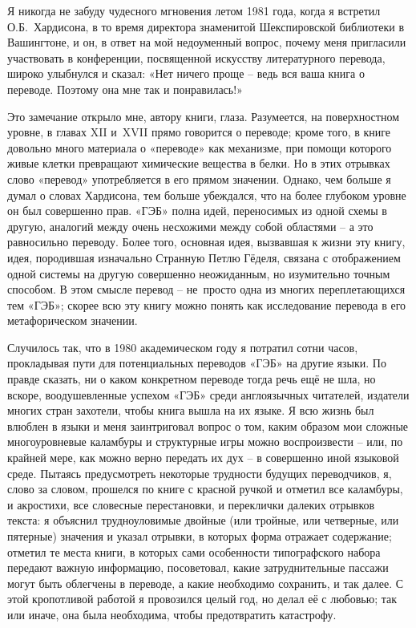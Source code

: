\documentclass[../main.tex]{subfiles}
\begin{document}
Я никогда не забуду чудесного мгновения летом 1981 года, когда я встретил О.Б.~Хардисона, в то время директора знаменитой Шекспировской библиотеки в Вашингтоне, и он, в ответ на мой недоуменный вопрос, почему меня пригласили участвовать в конференции, посвященной искусству литературного перевода, широко улыбнулся и сказал: «Нет ничего проще \--- ведь вся ваша книга о переводе. Поэтому она мне так и понравилась!»

Это замечание открыло мне, автору книги, глаза. Разумеется, на поверхностном уровне, в главах XII и~XVII прямо говорится о переводе; кроме того, в книге довольно много материала о «переводе» как механизме, при помощи которого живые клетки превращают химические вещества в белки. Но в этих отрывках слово «перевод» употребляется в его прямом значении. Однако, чем больше я думал о словах Хардисона, тем больше убеждался, что на более глубоком уровне он был совершенно прав. «ГЭБ» полна идей, переносимых из одной схемы в другую, аналогий между очень несхожими между собой областями \--- а это равносильно переводу. Более того, основная идея, вызвавшая к жизни эту книгу, идея, породившая изначально Странную Петлю Гёделя, связана с отображением одной системы на другую совершенно неожиданным, но изумительно точным способом. В этом смысле перевод \--- не~просто одна из многих переплетающихся тем «ГЭБ»; скорее всю эту книгу можно понять как исследование перевода в его метафорическом значении.

Случилось так, что в 1980 академическом году я потратил сотни часов, прокладывая пути для потенциальных переводов «ГЭБ» на другие языки. По правде сказать, ни о каком конкретном переводе тогда речь ещё не шла, но вскоре, воодушевленные успехом «ГЭБ» среди англоязычных читателей, издатели многих стран захотели, чтобы книга вышла на их языке. Я всю жизнь был влюблен в языки и меня заинтриговал вопрос о том, каким образом мои сложные многоуровневые каламбуры и структурные игры можно воспроизвести \--- или, по крайней мере, как можно верно передать их дух \--- в совершенно иной языковой среде. Пытаясь предусмотреть некоторые трудности будущих переводчиков, я, слово за словом, прошелся по книге с красной ручкой и отметил все каламбуры, и акростихи, все словесные перестановки, и переклички далеких отрывков текста: я объяснил трудноуловимые двойные (или тройные, или четверные, или пятерные) значения и указал отрывки, в которых форма отражает содержание; отметил те места книги, в которых сами особенности типографского набора передают важную информацию, посоветовал, какие затруднительные пассажи могут быть облегчены в переводе, а какие необходимо сохранить, и так далее. С этой кропотливой работой я провозился целый год, но делал её с любовью; так или иначе, она была необходима, чтобы предотвратить катастрофу.
\end{document}
